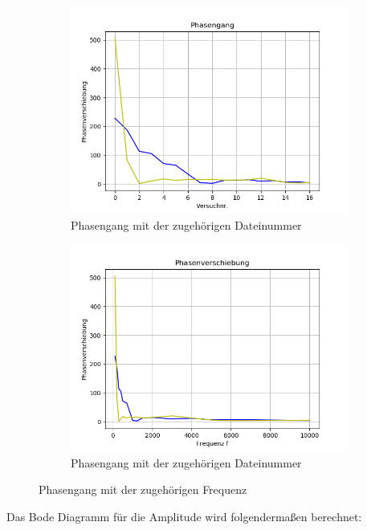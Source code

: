 \documentclass[12pt, oneside, a4paper, \docLanguage]{report}
\begin{document}
\begin{figure}[H]
\centering
\begin{subfigure}{.5\textwidth}
  \centering
  \includegraphics[width=0.9\linewidth]{../data/img/phasenanzahl.png}
  \caption{Phasengang mit der zugehörigen Dateinummer}
  \label{fig:Phasengang mit der zugehörigen Dateinummer}
\end{subfigure}%
\begin{subfigure}{.5\textwidth}
  \centering
  \includegraphics[width=0.9\linewidth]{../data/img/phasenfrequenz.png}
  \caption{Phasengang mit der zugehörigen Dateinummer}
  \label{fig:Phasengang mit der zugehörigen Dateinummer}
\end{subfigure}
\caption{Phasengang mit der zugehörigen Frequenz}
\label{fig:Phasengang mit der zugehörigen Frequenz}
\end{figure}
\newpage
Das Bode Diagramm für die Amplitude wird folgendermaßen berechnet:
\end{document}
